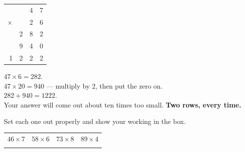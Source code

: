 \documentclass[12pt,a4paper]{article}
\begin{document}

\begin{remember}
  \noindent
  \begin{minipage}[t]{0.30\linewidth}
    \vspace{2pt}
    {\renewcommand{\arraystretch}{1.05}%
    \begin{tabular}{r@{\ }r@{\ }r@{\ }r}
              &   & 4 & 7 \\
      $\times$&   & 2 & 6 \\[1pt]
      \hline
              & 2 & 8 & 2 \\
              & 9 & 4 & 0 \\[1pt]
      \hline
      1       & 2 & 2 & 2 \\[1pt]
      \hline
    \end{tabular}}
  \end{minipage}%
  \begin{minipage}[t]{0.70\linewidth}
    \vspace{2pt}
     $47 \times 6 = 282$. \\
     $47 \times 20 = 940$ --- multiply by 2, then put the zero on. \\
     $282 + 940 = 1222$. \\[4pt]
     Your answer will come out about ten times too small. \textbf{Two rows,
    every time.}
  \end{minipage}
\end{remember}


\noindent Set each one out properly and show your working in the box.

\vspace{4pt}
\noindent
\begin{tabularx}{\textwidth}{|X|X|X|X|}
  \hline
  $46 \times 7$ & $58 \times 6$ & $73 \times 8$ & $89 \times 4$ \\
  \rule[-2.6em]{0pt}{3.2em} & & & \\
  \hline
\end{tabularx}
\end{document}

